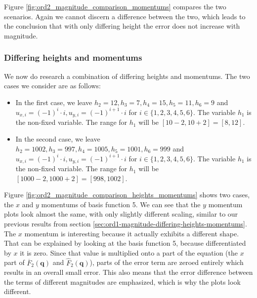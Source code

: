 \documentclass[a4paper, twoside]{article}
\begin{document}


Figure \ref{fig:ord2_magnitude_comparison_momentums} compares the two scenarios. Again we cannot discern a difference between the two, which leads to the conclusion that with only differing height the error does not increase with magnitude.

\subsubsection{Differing heights and momentums}
\label{sec:ord2-magnitude-differing-heights-momentums}

We now do research a combination of differing heights and momentums. The two cases we consider are as follows:

\begin{itemize}
	\item In the first case, we leave $h_2=12, h_3=7, h_4=15, h_5=11, h_6=9$ and $u_{x,i}=(-1)^i \cdot i, u_{y,i}=(-1)^{i+1} \cdot i$ for $i \in \{1,2,3,4,5,6\}$. The variable $h_1$ is the non-fixed variable. The range for $h_1$ will be $[10-2, 10+2]=[8,12]$.
\item In the second case, we leave $h_2=1002, h_3=997, h_4=1005, h_5=1001, h_6=999$ and $u_{x,i}=(-1)^i \cdot i, u_{y,i}=(-1)^{i+1} \cdot i$ for $i \in \{1,2,3,4,5,6\}$. The variable $h_1$ is the non-fixed variable. The range for $h_1$ will be $[1000-2, 1000+2]=[998,1002]$.
\end{itemize}



Figure \ref{fig:ord2_magnitude_comparison_heights_momentums} shows two cases, the $x$ and $y$ momentums of basis function 5.
We can see that the $y$ momentum plots look almost the same, with only slightly different scaling, similar to our previous results from section \ref{sec:ord1-magnitude-differing-heights-momentums}.
The $x$ momentum is interesting because it actually exhibits a different shape.
That can be explained by looking at the basis function 5, because differentiated by $x$ it is zero.
Since that value is multiplied onto a part of the equation (the $x$ part of $\overline{F}_2\left(\mathbf{q}\right)$ and $\widehat{F}_2\left(\mathbf{q}\right)$), parts of the error term are zeroed entirely which results in an overall small error.
This also means that the error difference between the terms of different magnitudes are emphasized, which is why the plots look different.
\end{document}
